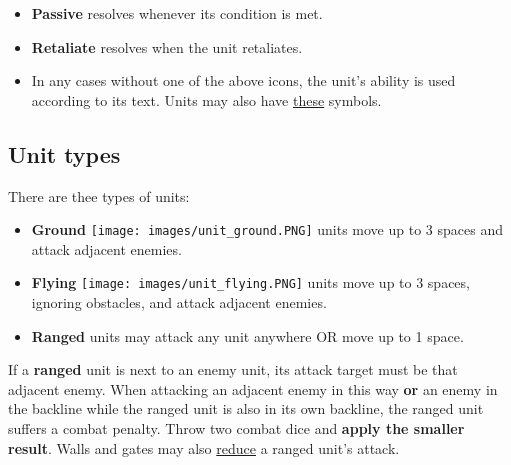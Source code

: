 \documentclass[12pt]{article}
\begin{document}
  \begin{minipage}{0.5\textwidth}
    \begin{itemize}[wide]
      \item\textbf{Passive}  resolves whenever its condition is met.
      \item\textbf{Retaliate}  resolves when the unit retaliates.
      \item In any cases without one of the above icons, the unit’s ability is used according to its text. Units may also have \hyperlink{Playerdecks}{these} symbols.
    \end{itemize}
  \end{minipage}

\clearpage
\subsection*{\hypertarget{Unittype}{Unit types}}
There are thee types of units:
\begin{itemize}
    \item \textbf{Ground} \texttt{[image: images/unit\_ground.PNG]} units move up to 3 spaces and attack adjacent enemies.
    \item \textbf{Flying} \texttt{[image: images/unit\_flying.PNG]} units move up to 3 spaces, ignoring obstacles, and attack adjacent enemies.
    \item \textbf{Ranged}  units may attack any unit anywhere OR move up to 1 space.
\end{itemize}
If a \textbf{ranged} unit is next to an enemy unit, its attack target must be that adjacent enemy. When attacking an adjacent enemy in this way \textbf{or} an enemy in the backline while the ranged unit is also in its own backline, the ranged unit suffers a combat penalty. Throw two combat dice and \textbf{apply the smaller result}. Walls and gates may also \hyperlink{Walls}{reduce} a ranged unit's attack.
\end{document}

